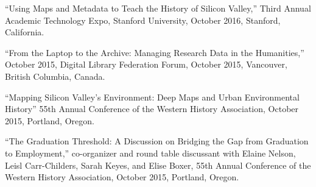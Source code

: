 ``Using Maps and Metadata to Teach the History of Silicon Valley,''
Third Annual Academic Technology Expo, Stanford University, October
2016, Stanford, California.

``From the Laptop to the Archive: Managing Research Data in the
Humanities,'' October 2015, Digital Library Federation Forum, October
2015, Vancouver, British Columbia, Canada.

``Mapping Silicon Valley's Environment: Deep Maps and Urban
Environmental History'' 55th Annual Conference of the Western History
Association, October 2015, Portland, Oregon.

``The Graduation Threshold: A Discussion on Bridging the Gap from
Graduation to Employment,'' co-organizer and round table discussant with
Elaine Nelson, Leisl Carr-Childers, Sarah Keyes, and Elise Boxer, 55th
Annual Conference of the Western History Association, October 2015,
Portland, Oregon.
